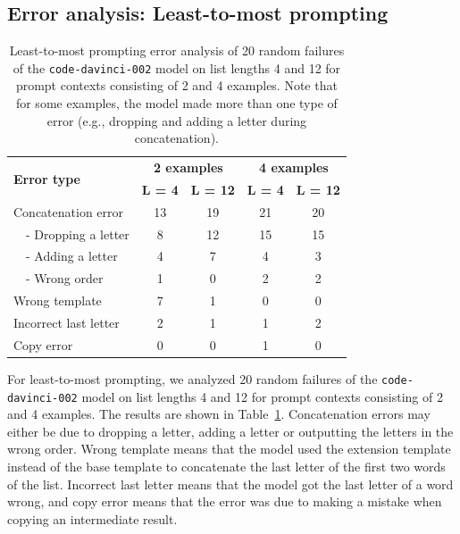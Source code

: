 \subsection{Error analysis: Least-to-most prompting}
\label{app:letter-error}

\begin{table}[h!]
\centering
\begin{tabular}{|l|c|c|c|c|}
    \hline
    \multirow{2}{*}{\textbf{Error type}} & \multicolumn{2}{c|}{\textbf{2 examples}} & \multicolumn{2}{c|}{\textbf{4 examples}} \\
    & \textbf{L = 4} & \textbf{L = 12} & \textbf{L = 4} & \textbf{L = 12} \\
    \hline
    Concatenation error & 13 & 19 & 21 & 20 \\
    \ \ - Dropping a letter & 8 & 12 & 15 & 15 \\
    \ \ - Adding a letter & 4 & 7 & 4 & 3 \\
    \ \ - Wrong order & 1 & 0 & 2 & 2 \\
    \hline
    Wrong template & 7 & 1 & 0 & 0 \\
    \hline
    Incorrect last letter & 2 & 1 & 1 & 2 \\
    \hline
    Copy error & 0 & 0 & 1 & 0 \\
    \hline
\end{tabular}
\vspace{5pt}
\caption{Least-to-most prompting error analysis of 20 random failures of the \texttt{code-davinci-002} model on list lengths 4 and 12 for prompt contexts consisting of 2 and 4 examples. Note that for some examples, the model made more than one type of error (e.g., dropping and adding a letter during concatenation).}
\label{table:letter-error-complete}
\end{table}

For least-to-most prompting, we analyzed 20 random failures of the \texttt{code-davinci-002} model on list lengths 4 and 12 for prompt contexts consisting of 2 and 4 examples. The results are shown in Table~\ref{table:letter-error-complete}. Concatenation errors may either be due to dropping a letter, adding a letter or outputting the letters in the wrong order. Wrong template means that the model used the extension template instead of the base template to concatenate the last letter of the first two words of the list. Incorrect last letter means that the model got the last letter of a word wrong, and copy error means that the error was due to making a mistake when copying an intermediate result.

